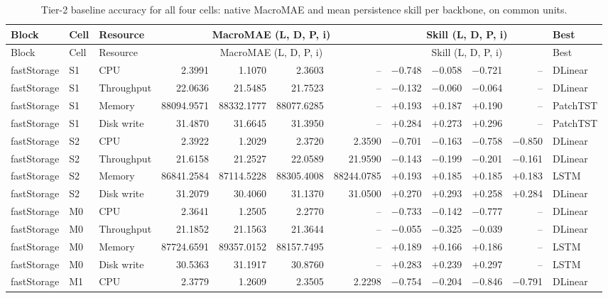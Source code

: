 \scriptsize
\setlength{\tabcolsep}{3pt}
\begin{longtable}{@{}lllrrrrrrrrl@{}}
\caption{Tier-2 baseline accuracy for all four cells: native MacroMAE and mean persistence skill per backbone, on common units.}\label{tab:supp-t2-baseline}\\
\toprule
Block & Cell & Resource & \multicolumn{4}{c}{MacroMAE (L, D, P, i)} & \multicolumn{4}{c}{Skill (L, D, P, i)} & Best \\
\midrule
\endfirsthead
\toprule
Block & Cell & Resource & \multicolumn{4}{c}{MacroMAE (L, D, P, i)} & \multicolumn{4}{c}{Skill (L, D, P, i)} & Best \\
\midrule
\endhead
\bottomrule
\endfoot
fastStorage & S1 & CPU & 2.3991 & 1.1070 & 2.3603 & -- & $-$0.748 & $-$0.058 & $-$0.721 & -- & DLinear \\
fastStorage & S1 & Throughput & 22.0636 & 21.5485 & 21.7523 & -- & $-$0.132 & $-$0.060 & $-$0.064 & -- & DLinear \\
fastStorage & S1 & Memory & 88094.9571 & 88332.1777 & 88077.6285 & -- & +0.193 & +0.187 & +0.190 & -- & PatchTST \\
fastStorage & S1 & Disk write & 31.4870 & 31.6645 & 31.3950 & -- & +0.284 & +0.273 & +0.296 & -- & PatchTST \\
fastStorage & S2 & CPU & 2.3922 & 1.2029 & 2.3720 & 2.3590 & $-$0.701 & $-$0.163 & $-$0.758 & $-$0.850 & DLinear \\
fastStorage & S2 & Throughput & 21.6158 & 21.2527 & 22.0589 & 21.9590 & $-$0.143 & $-$0.199 & $-$0.201 & $-$0.161 & DLinear \\
fastStorage & S2 & Memory & 86841.2584 & 87114.5228 & 88305.4008 & 88244.0785 & +0.193 & +0.185 & +0.185 & +0.183 & LSTM \\
fastStorage & S2 & Disk write & 31.2079 & 30.4060 & 31.1370 & 31.0500 & +0.270 & +0.293 & +0.258 & +0.284 & DLinear \\
fastStorage & M0 & CPU & 2.3641 & 1.2505 & 2.2770 & -- & $-$0.733 & $-$0.142 & $-$0.777 & -- & DLinear \\
fastStorage & M0 & Throughput & 21.1852 & 21.1563 & 21.3644 & -- & $-$0.055 & $-$0.325 & $-$0.039 & -- & DLinear \\
fastStorage & M0 & Memory & 87724.6591 & 89357.0152 & 88157.7495 & -- & +0.189 & +0.166 & +0.186 & -- & LSTM \\
fastStorage & M0 & Disk write & 30.5363 & 31.1917 & 30.8760 & -- & +0.283 & +0.239 & +0.297 & -- & LSTM \\
fastStorage & M1 & CPU & 2.3779 & 1.2609 & 2.3505 & 2.2298 & $-$0.754 & $-$0.204 & $-$0.846 & $-$0.791 & DLinear \\

\end{longtable}
